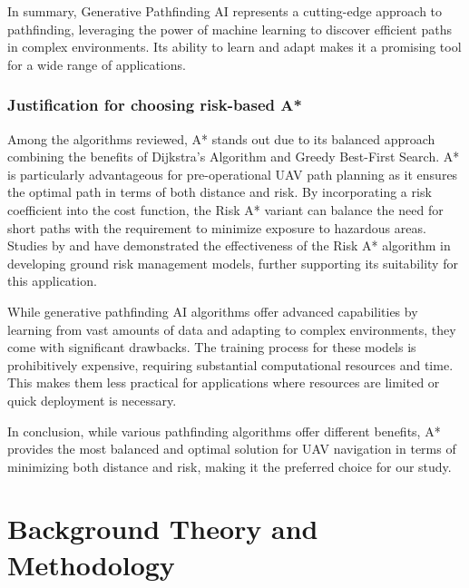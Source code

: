 \documentclass[12pt]{report}
\begin{document}
        In summary, Generative Pathfinding AI represents a cutting-edge approach to pathfinding, leveraging the power
        of machine learning to discover efficient paths in complex environments. Its ability to learn and adapt makes it
        a promising tool for a wide range of applications.

        \subsection{Justification for choosing risk-based A*}
        Among the algorithms reviewed, A* stands out due to its balanced approach combining the benefits of Dijkstra's
        Algorithm and Greedy Best-First Search. A* is particularly advantageous for pre-operational UAV path planning as
        it ensures the optimal path in terms of both distance and risk. By incorporating a risk coefficient into the
        cost function, the Risk A* variant can balance the need for short paths with the requirement to minimize
        exposure to hazardous areas. Studies by \cite{primatesta_ground_2020} and \cite{clothier_casualty_2007} have
        demonstrated the effectiveness of the Risk A* algorithm in developing ground risk management models, further
        supporting its suitability for this application.
            
        While generative pathfinding AI algorithms offer advanced capabilities by learning from vast amounts of data and
        adapting to complex environments, they come with significant drawbacks. The training process for these models is
        prohibitively expensive, requiring substantial computational resources and time. This makes them less practical
        for applications where resources are limited or quick deployment is necessary.
            
        In conclusion, while various pathfinding algorithms offer different benefits, A* provides the most balanced and
        optimal solution for UAV navigation in terms of minimizing both distance and risk, making it the preferred
        choice for our study.

\chapter{Background Theory and Methodology}
\end{document}

